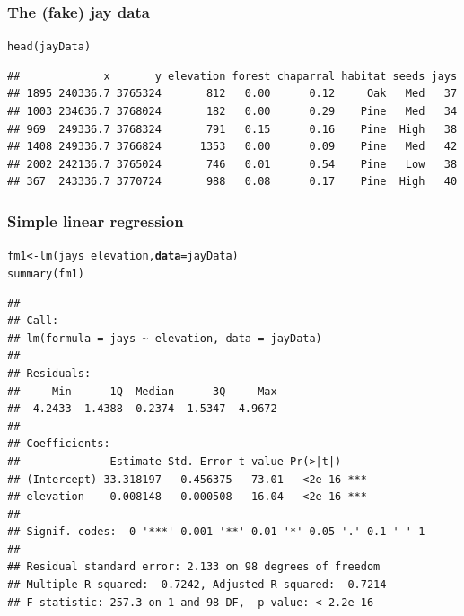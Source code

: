 \documentclass[color=usenames,dvipsnames]{beamer}\usepackage[]{graphicx}\usepackage[]{color}
\makeatletter
\newcommand{\hlopt}[1]{\textcolor[rgb]{0,0,0}{#1}}%
\newcommand{\hlstd}[1]{\textcolor[rgb]{0,0,0}{#1}}%
\newcommand{\hlkwb}[1]{\textcolor[rgb]{0,0.341,0.682}{#1}}%
\newcommand{\hlkwc}[1]{\textcolor[rgb]{0,0,0}{\textbf{#1}}}%
\newcommand{\hlkwd}[1]{\textcolor[rgb]{0.004,0.004,0.506}{#1}}%
\newenvironment{kframe}{%
 \def\at@end@of@kframe{}%
 \ifinner\ifhmode%
  \def\at@end@of@kframe{\end{minipage}}%
  \begin{minipage}{\columnwidth}%
 \fi\fi%
 \def\FrameCommand##1{\hskip\@totalleftmargin \hskip-\fboxsep
 \colorbox{shadecolor}{##1}\hskip-\fboxsep
     \hskip-\linewidth \hskip-\@totalleftmargin \hskip\columnwidth}%
 \MakeFramed {\advance\hsize-\width
   \@totalleftmargin\z@ \linewidth\hsize
   \@setminipage}}%
 {\par\unskip\endMakeFramed%
 \at@end@of@kframe}
\newenvironment{knitrout}{}{} %
\makeatother
\begin{document}
\begin{frame}[fragile]
  \frametitle{The (fake) jay data}
\begin{knitrout}\scriptsize
{}\color{fgcolor}\begin{kframe}
\begin{alltt}
\hlkwd{head}\hlstd{(jayData)}
\end{alltt}
\begin{verbatim}
##             x       y elevation forest chaparral habitat seeds jays
## 1895 240336.7 3765324       812   0.00      0.12     Oak   Med   37
## 1003 234636.7 3768024       182   0.00      0.29    Pine   Med   34
## 969  249336.7 3768324       791   0.15      0.16    Pine  High   38
## 1408 249336.7 3766824      1353   0.00      0.09    Pine   Med   42
## 2002 242136.7 3765024       746   0.01      0.54    Pine   Low   38
## 367  243336.7 3770724       988   0.08      0.17    Pine  High   40
\end{verbatim}
\end{kframe}
\end{knitrout}
\end{frame}




\begin{frame}[fragile]
  \frametitle{Simple linear regression}
\begin{knitrout}\scriptsize
{}\color{fgcolor}\begin{kframe}
\begin{alltt}
\hlstd{fm1} \hlkwb{<-} \hlkwd{lm}\hlstd{(jays} \hlopt{~} \hlstd{elevation,} \hlkwc{data}\hlstd{=jayData)}
\hlkwd{summary}\hlstd{(fm1)}
\end{alltt}
\begin{verbatim}
## 
## Call:
## lm(formula = jays ~ elevation, data = jayData)
## 
## Residuals:
##     Min      1Q  Median      3Q     Max 
## -4.2433 -1.4388  0.2374  1.5347  4.9672 
## 
## Coefficients:
##              Estimate Std. Error t value Pr(>|t|)    
## (Intercept) 33.318197   0.456375   73.01   <2e-16 ***
## elevation    0.008148   0.000508   16.04   <2e-16 ***
## ---
## Signif. codes:  0 '***' 0.001 '**' 0.01 '*' 0.05 '.' 0.1 ' ' 1
## 
## Residual standard error: 2.133 on 98 degrees of freedom
## Multiple R-squared:  0.7242,	Adjusted R-squared:  0.7214 
## F-statistic: 257.3 on 1 and 98 DF,  p-value: < 2.2e-16
\end{verbatim}
\end{kframe}
\end{knitrout}
\end{frame}
\end{document}
